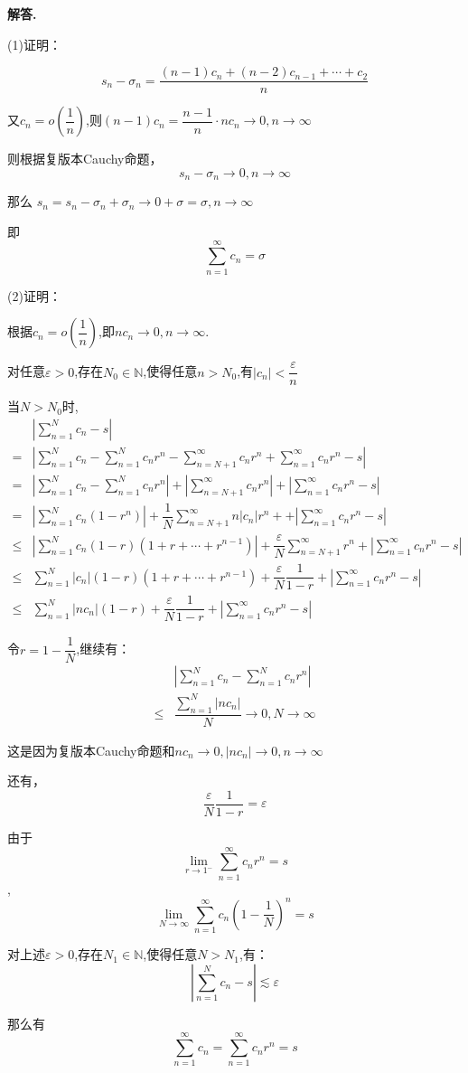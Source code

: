 \documentclass[12pt, a4paper, oneside]{ctexart}
\newenvironment{solution}{\par\noindent\textbf{解答. }}{\par}
\begin{document}
\begin{solution}
\par
(1)证明：
\par
$$
s_n-\sigma_n=\dfrac{(n-1)c_n+(n-2)c_{n-1}+\cdots+c_2}{n}
$$
\par
又$c_n=o\left(\dfrac{1}{n}\right)$,则$(n-1)c_n=\dfrac{n-1}{n}\cdot nc_n\to 0, n\to \infty$
\par
则根据复版本Cauchy命题，
$$
s_n-\sigma_n\to 0, n \to \infty
$$
\par
那么
$s_n=s_n-\sigma_n+\sigma_n\to 0+\sigma=\sigma, n \to \infty$
\par
即
$$
\sum_{n=1}^{\infty}c_n=\sigma
$$
\par
(2)证明：
\par
根据$c_n=o\left(\dfrac{1}{n}\right)$,即$nc_n\to 0,n\to \infty$.
\par
对任意$\varepsilon>0$,存在$N_0\in \mathbb{N}$,使得任意$n>N_0$,有$|c_n|<\dfrac{\varepsilon}{n}$
\par
当$N>N_0$时,
$$
\begin{aligned}
&\left|\sum_{n=1}^{N}c_n-s\right|\\
=&\left|\sum_{n=1}^{N}c_n-\sum_{n=1}^{N}c_nr^n-
\sum_{n=N+1}^{\infty}c_nr^n+\sum_{n=1}^{\infty}c_nr^n-s\right|\\
=&\left|\sum_{n=1}^{N}c_n-\sum_{n=1}^{N}c_nr^n\right|
+\left|\sum_{n=N+1}^{\infty}c_nr^n\right|
+\left|\sum_{n=1}^{\infty}c_nr^n-s\right|\\
=&\left|\sum_{n=1}^{N}c_n(1-r^n)\right|+
\dfrac{1}{N}\sum_{n=N+1}^{\infty}n|c_n|r^n+
+\left|\sum_{n=1}^{\infty}c_nr^n-s\right|
\\
\leqslant&\left|\sum_{n=1}^{N}c_n(1-r)(1+r+\cdots+r^{n-1})\right|
+\dfrac{\varepsilon}{N}\sum_{n=N+1}^{\infty}r^n
+\left|\sum_{n=1}^{\infty}c_nr^n-s\right|\\
\leqslant &\sum_{n=1}^{N}|c_n|(1-r)(1+r+\cdots+r^{n-1})+
\dfrac{\varepsilon}{N}\dfrac{1}{1-r}+
\left|\sum_{n=1}^{\infty}c_nr^n-s\right|
\\
\leqslant &\sum_{n=1}^{N}|nc_n|(1-r)
+\dfrac{\varepsilon}{N}\dfrac{1}{1-r}+
\left|\sum_{n=1}^{\infty}c_nr^n-s\right|
\end{aligned}
$$
\par
令$r=1-\dfrac{1}{N}$,继续有：
$$
\begin{aligned}
    &\left|\sum_{n=1}^{N}c_n-\sum_{n=1}^{N}c_nr^n\right|\\
    \leqslant &\dfrac{\sum_{n=1}^{N}|nc_n|}{N}\to 0, N \to \infty
    \end{aligned}
$$
\par
这是因为复版本Cauchy命题和$nc_n\to 0, |nc_n|\to 0, n\to \infty$
\par
还有，
$$
\dfrac{\varepsilon}{N}\dfrac{1}{1-r}=\varepsilon
$$
\par
由于$$
\lim_{r \to 1^-}\sum_{n=1}^{\infty}c_nr^n= s
$$
,
$$
\lim_{N \to \infty}\sum_{n=1}^{\infty}c_n\left(1-\dfrac{1}{N}\right)^n= s
$$
\par
对上述$\varepsilon>0$,存在$N_1 \in \mathbb{N}$,使得任意$N>N_1$,有：
$$
\left|\sum_{n=1}^{N}c_n-s\right|\lesssim \varepsilon
$$
\par
那么有
$$
\sum_{n=1}^{\infty}c_n=\sum_{n=1}^{\infty}c_nr^n=s
$$
\end{solution}
\end{document}
